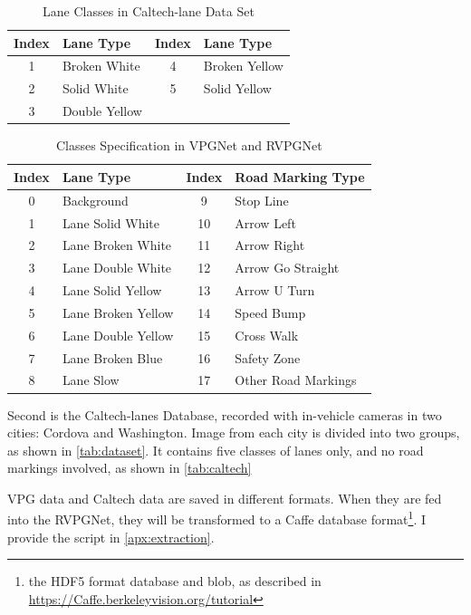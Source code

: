 \begin{spacing}{1.5}
\begin{table}[!ht]
\centering
\caption{Lane Classes in Caltech-lane Data Set}
\label{tab:caltech}
\begin{tabular}{@{}clcl@{}}
\toprule
Index & Lane Type & Index & Lane Type \\ \midrule
1 & Broken White & 4 & Broken Yellow \\
2 & Solid White & 5 & Solid Yellow \\
3 & Double Yellow & \multicolumn{1}{l}{} &  \\ \bottomrule
\end{tabular}
\end{table}


\begin{table}[ht]
\centering
\caption{Classes Specification in VPGNet and RVPGNet}
\label{tab:classes}
\begin{tabular}{clcl}
\toprule
Index & Lane Type          & Index & Road Marking Type   \\ \midrule
0     & Background         & 9     & Stop Line           \\
1     & Lane Solid White   & 10    & Arrow Left          \\
2     & Lane Broken White  & 11    & Arrow Right         \\
3     & Lane Double White  & 12    & Arrow Go Straight   \\
4     & Lane Solid Yellow  & 13    & Arrow U Turn        \\
5     & Lane Broken Yellow & 14    & Speed Bump          \\
6     & Lane Double Yellow & 15    & Cross Walk          \\
7     & Lane Broken Blue   & 16    & Safety Zone         \\
8     & Lane Slow          & 17    & Other Road Markings \\ \bottomrule
\end{tabular}
\end{table}%


Second is the Caltech-lanes Database, recorded with in-vehicle cameras in two cities: Cordova and Washington. Image from each city is divided into two groups, as shown in \autoref{tab:dataset}. It contains five classes of lanes only, and no road markings involved, as shown in \autoref{tab:caltech}

VPG data and Caltech data are saved in different formats. When they are fed into the RVPGNet, they will be transformed to a Caffe database format\footnote{the HDF5 format database and blob, as described in \url{https://Caffe.berkeleyvision.org/tutorial}}. I provide the script in \autoref{apx:extraction}.


\end{spacing}
